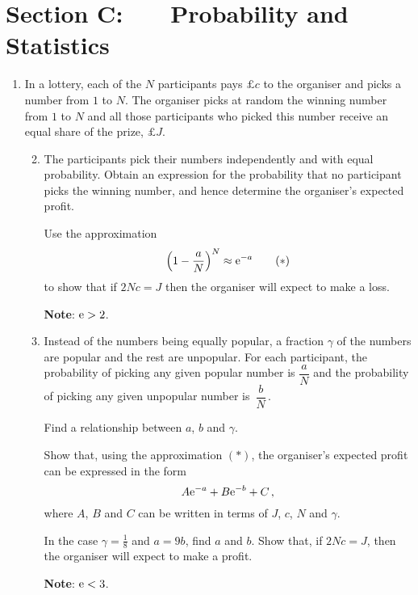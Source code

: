 \documentclass[a4, 11pt]{report}
\newlength{\qspace}
\newcounter{qnumber}
\newenvironment{question}%
 {\vspace{\qspace}
  \begin{enumerate}[\bfseries 1\quad][10]%
    \setcounter{enumi}{\value{qnumber}}%
    \item%
 }
{
  \end{enumerate}
  \filbreak
  \stepcounter{qnumber}
 }
\newenvironment{questionparts}[1][1]%
 {
  \begin{enumerate}[\bfseries (i)]%
    \setcounter{enumii}{#1}
    \addtocounter{enumii}{-1}
    \setlength{\itemsep}{5mm}
    \setlength{\parskip}{8pt}
 }
 {
  \end{enumerate}
 }
\def\e{{\rm e}}
\begin{document}
\newpage

\section*{Section C: \ \ \ Probability and Statistics}

\vspace{-3mm}


\begin{question}


In a lottery, each of the $N$ participants pays $\pounds c$ 
to the organiser and picks 
a number from $1$ to $N$. 
The organiser picks at random the winning number from $1$ to $N$  and 
all those participants who picked this number receive an equal 
share of the prize, $\pounds J$.



\begin{questionparts}

\item 
The participants pick their numbers 
independently and with equal probability. 
Obtain  an expression for the 
probability that no participant picks the 
winning number, and hence determine the organiser's expected profit.

Use  the approximation
\[
\left( 1 - \frac{a}{N} \right)^N \approx \e^{-a}
\tag{$*$}
\]
 to 
show that if $2Nc = J$ then the organiser will expect to make a loss.

{\bf Note}: $\e > 2$.  
 
\item Instead of the numbers being equally popular, 
a fraction $\gamma$ of the numbers are popular and the rest are unpopular.
For each participant,  
the probability of picking any given popular number is 
$\dfrac{a}{N}$ and the probability of picking
   any given unpopular number is~$\dfrac{b}{N}\,$. 

Find a relationship between $a$, $b$ and $\gamma$.

Show that,
using the 
approximation $(*)$,  
 the organiser's expected profit can be \mbox{expressed} 
in the form
\[
A\e^{-a} + B\e^{-b} +C
\,,
\]
where $A$, $B$ and $C$ can be written in terms of  $J$, $c$, $N$ and $\gamma$. 



In the case $\gamma = \frac18$ and $a=9b$, find $a$ and $b$. Show that,
 if  
 $2Nc = J$, then
 the organiser will expect to make a profit.

{\bf Note}: $\e < 3$.  


\end{questionparts}
\end{question}
\end{document}
